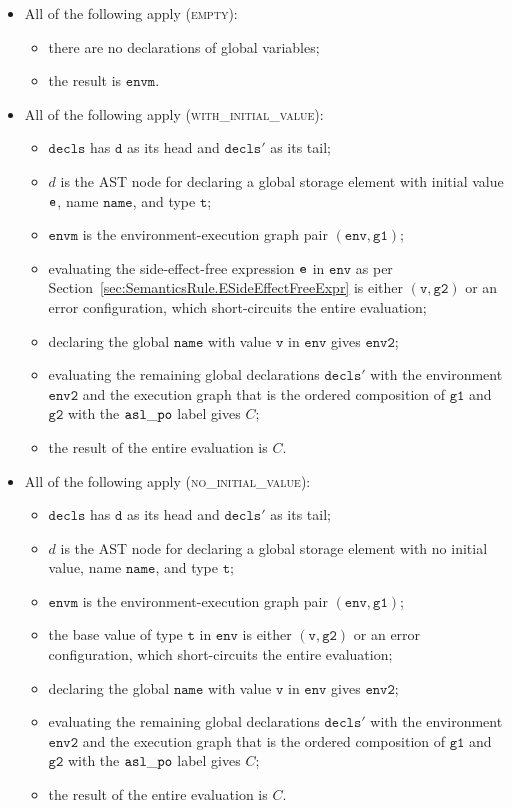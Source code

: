 \documentclass{book}
\newcommand\secref[1]{Section~\ref{sec:#1}}
\newcommand\ProseOrError[0]{or an error configuration, which short-circuits the entire evaluation}
\newcommand\env[0]{\texttt{env}}
\newcommand\envtwo[0]{\texttt{env2}}
\newcommand\vv[0]{\texttt{v}}
\newcommand\vt[0]{\texttt{t}}
\newcommand\vgone[0]{\texttt{g1}}
\newcommand\vgtwo[0]{\texttt{g2}}
\newcommand\name[0]{\texttt{name}}
\newcommand\envm[0]{\texttt{envm}}
\newcommand\vd[0]{\texttt{d}}
\newcommand\vdecls[0]{\texttt{decls}}
\begin{document}
\begin{itemize}
  \item All of the following apply (\textsc{empty}):
  \begin{itemize}
    \item there are no declarations of global variables;
    \item the result is $\envm$.
  \end{itemize}

  \item All of the following apply (\textsc{with\_initial\_value}):
  \begin{itemize}
    \item $\vdecls$ has $\vd$ as its head and $\vdecls'$ as its tail;
    \item $d$ is the AST node for declaring a global storage element with initial value $\texttt{e}$,
    name $\name$, and type $\vt$;
    \item $\envm$ is the environment-execution graph pair $(\env, \vgone)$;
    \item evaluating the side-effect-free expression $\texttt{e}$ in $\env$ as per \secref{SemanticsRule.ESideEffectFreeExpr}
    is either $(\vv, \vgtwo)$ \ProseOrError;
    \item declaring the global $\name$ with value $\vv$ in $\env$ gives $\envtwo$;
    \item evaluating the remaining global declarations $\vdecls'$ with the environment $\envtwo$ and the execution graph
    that is the ordered composition of $\vgone$ and $\vgtwo$ with the $\mathtt{asl\_po}$ label gives $C$;
    \item the result of the entire evaluation is $C$.
  \end{itemize}

  \item All of the following apply (\textsc{no\_initial\_value}):
  \begin{itemize}
    \item $\vdecls$ has $\vd$ as its head and $\vdecls'$ as its tail;
    \item $d$ is the AST node for declaring a global storage element with no initial value,
    name $\name$, and type $\vt$;
    \item $\envm$ is the environment-execution graph pair $(\env, \vgone)$;
    \item the base value of type $\vt$ in $\env$ is either $(\vv, \vgtwo)$ \ProseOrError;
    \item declaring the global $\name$ with value $\vv$ in $\env$ gives $\envtwo$;
    \item evaluating the remaining global declarations $\vdecls'$ with the environment $\envtwo$ and the execution graph
    that is the ordered composition of $\vgone$ and $\vgtwo$ with the $\mathtt{asl\_po}$ label gives $C$;
    \item the result of the entire evaluation is $C$.
  \end{itemize}
\end{itemize}
\end{document}
